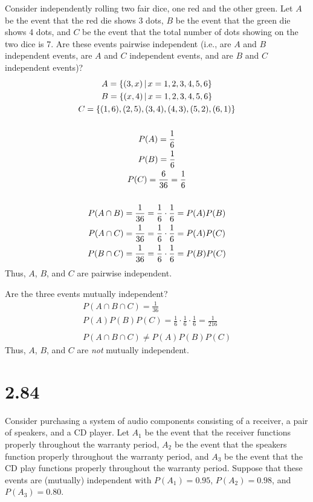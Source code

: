 \documentclass[letterpaper,12pt,fleqn]{article}
\begin{document}
Consider independently rolling two fair dice, one red and the other green.  Let \(A\) be the event that the red die shows
3 dots, \(B\) be the event that the green die shows 4 dots, and \(C\) be the event that the total number of dots showing on
the two dice is 7.  Are these events pairwise independent (i.e., are \(A\) and \(B\) independent events, are \(A\) and \(C\)
independent events, and are \(B\) and \(C\) independent events)?
\begin{gather*}
  A=\left\{{(3,x)}\,\middle|\,{x=1,2,3,4,5,6}\right\} \\
  B=\left\{{(x,4)}\,\middle|\,{x=1,2,3,4,5,6}\right\} \\
  C=\{(1,6),(2,5),(3,4),(4,3),(5,2),(6,1)\} \\
  \\
  P(A)=\frac{1}{6} \\
  P(B)=\frac{1}{6} \\
  P(C)=\frac{6}{36}=\frac{1}{6} \\
  \\
  P(A\cap B)=\frac{1}{36}=\frac{1}{6}\cdot\frac{1}{6}=P(A)P(B) \\
  P(A\cap C)=\frac{1}{36}=\frac{1}{6}\cdot\frac{1}{6}=P(A)P(C) \\
  P(B\cap C)=\frac{1}{36}=\frac{1}{6}\cdot\frac{1}{6}=P(B)P(C)
\end{gather*}
Thus, \(A\), \(B\), and \(C\) are pairwise independent.

Are the three events mutually independent?
\begin{gather*}
  P(A\cap B\cap C)=\frac{1}{36} \\
  P(A)P(B)P(C)=\frac{1}{6}\cdot\frac{1}{6}\cdot\frac{1}{6}=\frac{1}{216} \\
  \\
  P(A\cap B\cap C)\ne P(A)P(B)P(C)
\end{gather*}
Thus, \(A\), \(B\), and \(C\) are \emph{not} mutually independent.

\section*{2.84}

Consider purchasing a system of audio components consisting of a receiver, a pair of speakers, and a CD player.  Let \(A_1\)
be the event that the receiver functions properly throughout the warranty period, \(A_2\) be the event that the speakers
function properly throughout the warranty period, and \(A_3\) be the event that the CD play functions properly throughout
the warranty period.  Suppose that these events are (mutually) independent with \(P(A_1)=0.95\), \(P(A_2)=0.98\), and
\(P(A_3)=0.80\).
\end{document}
